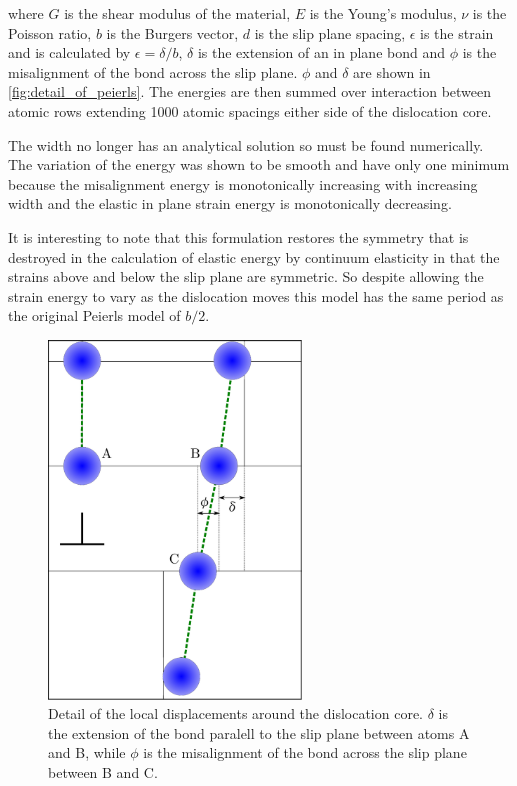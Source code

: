 where $G$ is the shear modulus of the material, $E$ is the Young's modulus, $\nu$ is the Poisson ratio, $b$ is the Burgers vector, $d$ is the slip plane spacing, $\epsilon$ is the strain and is calculated by $\epsilon = \delta/b$, $\delta$ is the extension of an in plane bond and $\phi$ is the misalignment of the bond across the slip plane. $\phi$ and $\delta$ are shown in \autoref{fig:detail_of_peierls}. The energies are then summed over interaction between atomic rows extending 1000 atomic spacings either side of the dislocation core.

The width no longer has an analytical solution so must be found numerically. The variation of the energy was shown to be smooth and have only one minimum because the misalignment energy is monotonically increasing with increasing width and the elastic in plane strain energy is monotonically decreasing.

It is interesting to note that this formulation restores the symmetry that is destroyed in the calculation of elastic energy by continuum elasticity in that the strains above and below the slip plane are symmetric. So despite allowing the strain energy to vary as the dislocation moves this model has the same period as the original Peierls model of $b/2$.

\begin{figure}
\centering
\includegraphics[width=0.6\textwidth]{peierls_model_detail}

\caption{Detail of the local displacements around the dislocation core. $\delta$ is the extension of the bond paralell to the slip plane between atoms A and B, while $\phi$ is the misalignment of the bond across the slip plane between B and C.\label{fig:detail_of_peierls}}
\end{figure}




